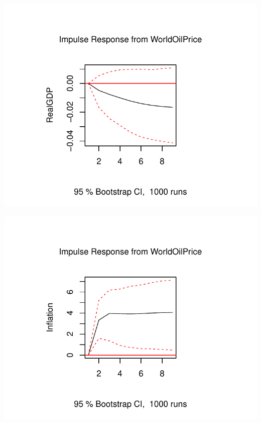 \documentclass[11pt,preprint, authoryear]{elsarticle}
\numberwithin{equation}{section}
\numberwithin{figure}{section}
\numberwithin{table}{section}
\begin{document}
\begin{center}\includegraphics{README_files/figure-latex/unnamed-chunk-13-3} \end{center}

\begin{center}\includegraphics{README_files/figure-latex/unnamed-chunk-13-4} \end{center}
\end{document}

